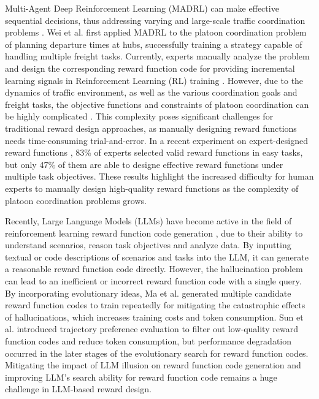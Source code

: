 \documentclass[lettersize,journal]{IEEEtran}
\begin{document}
Multi-Agent Deep Reinforcement Learning (MADRL) can make effective sequential decisions, thus addressing varying and large-scale traffic coordination problems \cite{pan2024towards,kumaravel2021optimal,pan2024heterogeneous}.
Wei et al. \cite{wei2023multi} first applied MADRL to the platoon coordination problem of planning departure times at hubs,  successfully training a strategy capable of handling multiple freight tasks. Currently, experts manually analyze the problem and design the corresponding reward function code for providing incremental learning signals in Reinforcement Learning (RL) training \cite{singh2009rewards,laud2004theory}. 
However, due to the  dynamics of traffic environment, as well as the various coordination goals and freight tasks, the objective functions and constraints of platoon coordination  can be highly complicated \cite{bouchery2022coalition, johansson2023hub,hu2024optimal}. 
This complexity poses significant challenges for traditional reward design approaches, as manually designing reward functions needs time-consuming trial-and-error.
In a recent experiment on expert-designed reward functions \cite{booth2023perils}, 83\% of experts selected valid reward functions in easy tasks, but only 47\% of them are able to designe effective reward functions under multiple task objectives. 
These results highlight the increased difficulty for human experts to manually design high-quality reward functions as the complexity of platoon coordination problems grows.
 

Recently, Large Language Models (LLMs) have become active in the field of reinforcement learning reward function code generation \cite{yu2023language,maeureka,li2024auto,xietext2reward,han2024autoreward}, due to their ability to understand scenarios, reason task objectives and analyze data. 
By inputting textual or code descriptions of scenarios and tasks into the LLM, it can generate a reasonable reward function code directly. 
However, the hallucination problem \cite{ji2023towards,liu2024exploring,yao2023llm} can lead to an inefficient or incorrect reward function code with a single query. 
By incorporating evolutionary ideas, Ma et al.\cite{maeureka} generated multiple candidate reward function codes to train repeatedly for mitigating the catastrophic effects of hallucinations, which increases training costs and token consumption. 
Sun et al. \cite{sun2024large} introduced trajectory preference evaluation to filter out low-quality reward function codes and reduce token consumption, but performance degradation occurred in the later stages of the evolutionary search for reward function codes.
Mitigating the impact of LLM illusion on reward function code generation and improving LLM's search ability for reward function code remains a huge challenge in LLM-based reward design.
\end{document}
